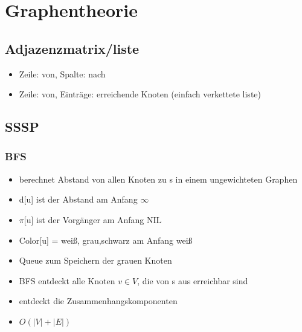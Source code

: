 \documentclass{article}
\begin{document}
\section{Graphentheorie}
\subsection{Adjazenzmatrix/liste}
\begin{itemize}
\item Zeile: von, Spalte: nach
\item Zeile: von, Eintr{\"a}ge: erreichende Knoten (einfach verkettete liste)
\end{itemize}

\subsection{SSSP}
\subsubsection{BFS}
\begin{itemize}
\item berechnet Abstand von allen Knoten zu s in einem ungewichteten Graphen
\item d[u] ist der Abstand am Anfang $\infty$
\item $\pi$[u] ist der Vorg{\"a}nger am Anfang NIL
\item Color[u] = wei\ss, grau,schwarz am Anfang wei\ss
\item Queue zum Speichern der grauen Knoten
\item BFS entdeckt alle Knoten $v\in V$, die von s aus erreichbar sind
\item entdeckt die Zusammenhangskomponenten
\item $O(|V|+|E|)$
\end{itemize}
\end{document}
